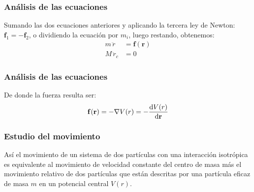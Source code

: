 \begin{frame}
\frametitle{Análisis de las ecuaciones}
Sumando las dos ecuaciones anteriores y aplicando la tercera ley de Newton: $\mathbf{f}_{1} = - \mathbf{f}_{2}$, o dividiendo la ecuación por $m_{i}$, luego restando, obtenemos:
\begin{align}
m \, \ddot{r} &= \mathbf{f(r)} \\
M \, \ddot{r}_{c} &= 0
\end{align}
\end{frame}
\begin{frame}
\frametitle{Análisis de las ecuaciones}
De donde la fuerza resulta ser:
\begin{align*}
\mathbf{f(r)}= - \nabla V(r) = - \dv{V(r)}{\mathbf{r}}
\end{align*}
\end{frame}
\begin{frame}
\frametitle{Estudio del movimiento}
Así el movimiento de un sistema de dos partículas con una interacción isotrópica es equivalente al movimiento de velocidad constante del centro de masa más el movimiento relativo de dos partículas que están descritas por una partícula eficaz de masa $m$ en un potencial central $V(r)$.
\end{frame}
